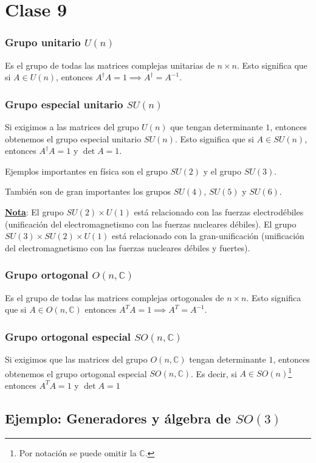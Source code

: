 \section{Clase 9}
\subsubsection{Grupo unitario $U(n)$}
Es el grupo de todas las matrices complejas unitarias de $n\times n$. Esto significa que si $A\in U(n)$, entonces $A^\dagger A=1\implies A^\dagger=A^{-1}$.

\subsubsection{Grupo especial unitario $SU(n)$}
Si exigimos a las matrices del grupo $U(n)$ que tengan determinante $1$, entonces obtenemos el grupo especial unitario $SU(n)$. Esto significa que si $A\in SU(n)$, entonces $A^\dagger A=1$ y $\det A=1$.

Ejemplos importantes en física son el grupo $SU(2)$ y el grupo $SU(3)$.

También son de gran importantes los grupos $SU(4)$, $SU(5)$ y $SU(6)$.

\underline{\textbf{Nota}}: El grupo $SU(2)\times U(1)$ está relacionado con las fuerzas electrodébiles (unificación del electromagnetismo con las fuerzas nucleares débiles). El grupo $SU(3)\times SU(2)\times U(1)$ está relacionado con la gran-unificación (unificación del electromagnetismo con las fuerzas nucleares débiles y fuertes).

\subsubsection{Grupo ortogonal $O(n,\mathbb{C})$}
Es el grupo de todas las matrices complejas ortogonales de $n\times n$. Esto significa que si $A\in O(n,\mathbb{C})$ entonces $A^TA=1\implies A^T=A^{-1}$.

\subsubsection{Grupo ortogonal especial $SO(n,\mathbb{C})$}
Si exigimos que las matrices del grupo $O(n,\mathbb{C})$ tengan determinante $1$, entonces obtenemos el grupo ortogonal especial $SO(n,\mathbb{C})$. Es decir, si $A\in SO(n)$\footnote{Por notación se puede omitir la $\mathbb{C}$.} entonces $A^TA=1$ y $\det A=1$

\subsection{Ejemplo: Generadores y álgebra de $SO(3)$}

